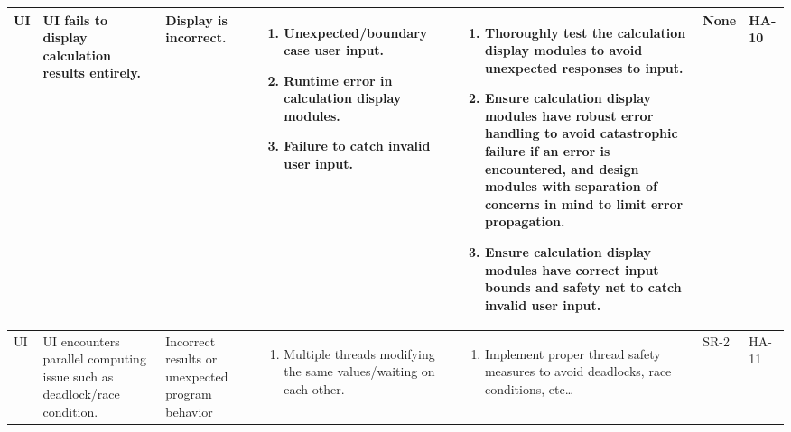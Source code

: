 \documentclass{article}
\begin{document}
\begin{landscape}
\begin{longtable}{|p{} | p{} | p{} | p{} | p{} | p{} | p{}|}
  UI & UI fails to display calculation results entirely. &  Display is incorrect. &
  \begin{enumerate}[leftmargin=*, label={\alph*.}, itemsep=1pt, topsep=0pt, partopsep=0pt] 
    \item Unexpected/boundary case user input.               
    \item Runtime error in calculation display modules.
    \item Failure to catch invalid user input.
  \end{enumerate} &
  \begin{enumerate}[leftmargin=*, label={\alph*.}, itemsep=1pt, topsep=0pt, partopsep=0pt] 
    \item Thoroughly test the calculation display modules to avoid unexpected responses to input.
    \item Ensure calculation display modules have robust error handling to avoid catastrophic failure if an error is 
    encountered, and design modules with separation of concerns in mind to limit error propagation.
    \item Ensure calculation display modules have correct input bounds and safety net to catch invalid user input.
  \end{enumerate} & 
  None & HA-10 \\

  \hline

  UI & UI encounters parallel computing issue such as deadlock/race condition. & 
  Incorrect results or unexpected program behavior &
  \begin{enumerate}[leftmargin=*, label={\alph*.}, itemsep=1pt, topsep=0pt, partopsep=0pt] 
    \item Multiple threads modifying the same values/waiting on each other.
  \end{enumerate} &
  \begin{enumerate}[leftmargin=*, label={\alph*.}, itemsep=1pt, topsep=0pt, partopsep=0pt] 
    \item Implement proper thread safety measures to avoid deadlocks, race conditions, etc\ldots
  \end{enumerate} &
  SR-2 & HA-11 \\

  \hline
  

\end{longtable}
\end{landscape}
\end{document}
